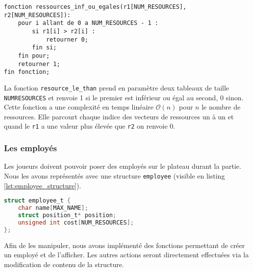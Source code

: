 \begin{lstlisting}[style=customstyle]
fonction ressources_inf_ou_egales(r1[NUM_RESOURCES], r2[NUM_RESOURCES]):
    pour i allant de 0 a NUM_RESOURCES - 1 :
        si r1[i] > r2[i] :
            retourner 0;
        fin si;
    fin pour;
    retourner 1;
fin fonction;
\end{lstlisting}
\vspace{-0.25cm}
\label{lst:resource_comparison}
\vspace{0.5cm}
La fonction \texttt{resource\_le\_than} prend en paramètre deux tableaux de taille \texttt{NUM\textunderscore RESOURCES} et renvoie 1 si le premier est inférieur ou égal au second, 0 sinon.\\
Cette fonction a une complexité en temps linéaire \(\mathcal{O}(n)\) pour \(n\) le nombre de ressources.
Elle parcourt chaque indice des vecteurs de ressources un à un et quand le \texttt{r1} a une valeur plus élevée que \texttt{r2} on renvoie \(0\).

\subsubsection*{Les employés}
Les joueurs doivent pouvoir poser des employés sur le plateau durant la partie.
Nous les avons représentés avec une structure \texttt{employee} (visible en listing \ref{lst:employee_structure}).
\begin{lstlisting}[language=C, backgroundcolor=\color{black!5}, frame=single, frameround=tttt, basicstyle=\ttfamily, breaklines=true, keywordstyle=\color{blue}, commentstyle=\color{green!50!black}, stringstyle=\color{red}]
struct employee_t {
    char name[MAX_NAME];
    struct position_t* position;
    unsigned int cost[NUM_RESOURCES];
};
\end{lstlisting}
\vspace{-0.25cm}
\label{lst:employee_structure}
\vspace{0.5cm}
Afin de les manipuler, nous avons implémenté des fonctions permettant de créer un employé et de l'afficher. Les autres actions seront directement effectuées via la modification de contenu de la structure.

